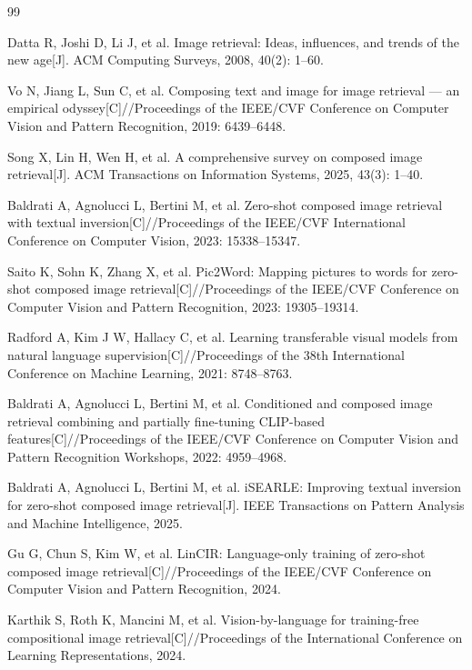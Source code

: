 \documentclass[12pt,a4paper,UTF8,oneside,openany]{ctexrep}
\begin{document}
\begin{thebibliography}{99}
\small

Datta R, Joshi D, Li J, et al. Image retrieval: Ideas, influences, and trends of the new age[J]. ACM Computing Surveys, 2008, 40(2): 1--60.

Vo N, Jiang L, Sun C, et al. Composing text and image for image retrieval --- an empirical odyssey[C]//Proceedings of the IEEE/CVF Conference on Computer Vision and Pattern Recognition, 2019: 6439--6448.

Song X, Lin H, Wen H, et al. A comprehensive survey on composed image retrieval[J]. ACM Transactions on Information Systems, 2025, 43(3): 1--40.

Baldrati A, Agnolucci L, Bertini M, et al. Zero-shot composed image retrieval with textual inversion[C]//Proceedings of the IEEE/CVF International Conference on Computer Vision, 2023: 15338--15347.

Saito K, Sohn K, Zhang X, et al. Pic2Word: Mapping pictures to words for zero-shot composed image retrieval[C]//Proceedings of the IEEE/CVF Conference on Computer Vision and Pattern Recognition, 2023: 19305--19314.

Radford A, Kim J W, Hallacy C, et al. Learning transferable visual models from natural language supervision[C]//Proceedings of the 38th International Conference on Machine Learning, 2021: 8748--8763.

Baldrati A, Agnolucci L, Bertini M, et al. Conditioned and composed image retrieval combining and partially fine-tuning CLIP-based features[C]//Proceedings of the IEEE/CVF Conference on Computer Vision and Pattern Recognition Workshops, 2022: 4959--4968.

Baldrati A, Agnolucci L, Bertini M, et al. iSEARLE: Improving textual inversion for zero-shot composed image retrieval[J]. IEEE Transactions on Pattern Analysis and Machine Intelligence, 2025.

Gu G, Chun S, Kim W, et al. LinCIR: Language-only training of zero-shot composed image retrieval[C]//Proceedings of the IEEE/CVF Conference on Computer Vision and Pattern Recognition, 2024.

Karthik S, Roth K, Mancini M, et al. Vision-by-language for training-free compositional image retrieval[C]//Proceedings of the International Conference on Learning Representations, 2024.


\end{thebibliography}
\end{document}
